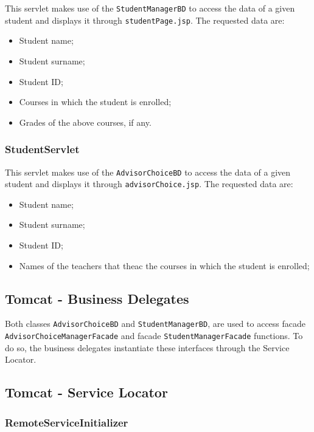 \documentclass{article}
\begin{document}
This servlet makes use of the \texttt{StudentManagerBD} to access the data of a given student and displays it through \texttt{studentPage.jsp}.
The requested data are:
\begin{itemize}
    \item Student name;
    \item Student surname;
    \item Student ID;
    \item Courses in which the student is enrolled;
    \item Grades of the above courses, if any.
\end{itemize}

\subsubsection*{StudentServlet}

This servlet makes use of the \texttt{AdvisorChoiceBD} to access the data of a given student and displays it through \texttt{advisorChoice.jsp}.
The requested data are:
\begin{itemize}
    \item Student name;
    \item Student surname;
    \item Student ID;
    \item Names of the teachers that theac the courses in which the student is enrolled;
\end{itemize}

\subsection*{Tomcat - Business Delegates}

Both classes \texttt{AdvisorChoiceBD} and \texttt{StudentManagerBD}, are used to access facade \texttt{AdvisorChoiceManagerFacade} and facade \texttt{StudentManagerFacade} functions. To do so, the business delegates instantiate these interfaces through the Service Locator.

\subsection*{Tomcat - Service Locator}

\subsubsection*{RemoteServiceInitializer}
\end{document}

